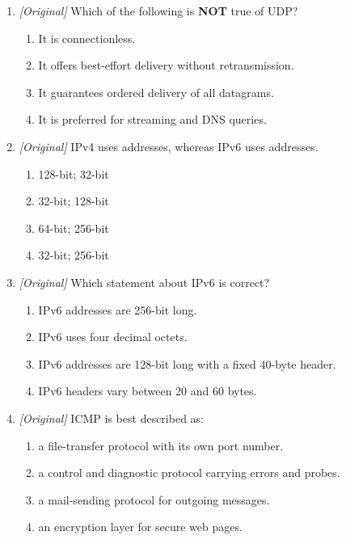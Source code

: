 \documentclass[11pt]{article}
\begin{document}
\begin{enumerate}[label=\textbf{Q\arabic*.}, leftmargin=*]
\begin{enumerate}[label=\Alph*.]
    \item encryption of the message body.
    \item translation of names into addresses.
  \end{enumerate}
\item \textit{[Original]} Which of the following is \textbf{NOT} true of UDP?
  \begin{enumerate}[label=\Alph*.]
    \item It is connectionless.
    \item It offers best-effort delivery without retransmission.
    \item It guarantees ordered delivery of all datagrams.
    \item It is preferred for streaming and DNS queries.
  \end{enumerate}
\item \textit{[Original]} IPv4 uses \underline{\hspace{2.2cm}} addresses,
  whereas IPv6 uses \underline{\hspace{2.2cm}} addresses.
  \begin{enumerate}[label=\Alph*.]
    \item 128-bit; 32-bit
    \item 32-bit; 128-bit
    \item 64-bit; 256-bit
    \item 32-bit; 256-bit
  \end{enumerate}
\item \textit{[Original]} Which statement about IPv6 is correct?
  \begin{enumerate}[label=\Alph*.]
    \item IPv6 addresses are 256-bit long.
    \item IPv6 uses four decimal octets.
    \item IPv6 addresses are 128-bit long with a fixed 40-byte header.
    \item IPv6 headers vary between 20 and 60 bytes.
  \end{enumerate}
\item \textit{[Original]} ICMP is best described as:
  \begin{enumerate}[label=\Alph*.]
    \item a file-transfer protocol with its own port number.
    \item a control and diagnostic protocol carrying errors and probes.
    \item a mail-sending protocol for outgoing messages.
    \item an encryption layer for secure web pages.

\end{enumerate}
\end{enumerate}
\end{document}
